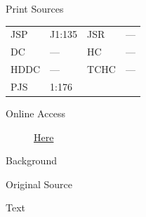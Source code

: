 			\begin{description}
				\item[Print Sources]
			\end{description}

				\begin{tabular}{p{0.5in}p{1in}p{0.5in}p{1in}}
				JSP	 	& J1:135		& JSR 		& --- \\
				DC	 	& --- 				& HC 		& --- \\
				HDDC 	& ---				& TCHC 		& --- \\
				PJS 	& 1:176				& 	 		&  \\
				\end{tabular}
			
			\begin{description}
				\item[Online Access] \href{https://www.josephsmithpapers.org/paper-summary/journal-1835-1836/88}{Here}
			\end{description}
			
			\begin{description}
				\item[Background]
			\end{description}
			
			
			\begin{description}
				\item[Original Source]
			\end{description}
			
			
			\begin{description}
				\item[Text]
			\end{description}
			
